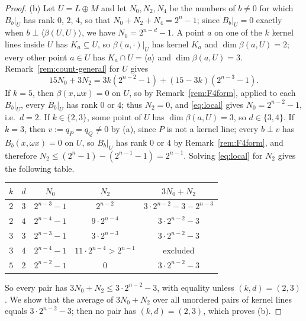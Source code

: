 \documentclass[11pt]{article}
\theoremstyle{definition}
\begin{document}
\begin{proof}
(b) Let $U=L\oplus M$ and let $N_0,N_2,N_4$ be the numbers of $b\neq0$ for which $B_b|_U$ has
rank $0$, $2$, $4$, so that $N_0+N_2+N_4=2^n-1$; since $B_b|_U=0$ exactly when
$b\perp\langle\beta(U,U)\rangle$, we have $N_0=2^{n-d}-1$. A point $a$ on one of the $k$ kernel
lines inside $U$ has $K_a\subseteq U$, so $\beta(a,\cdot)|_U$ has kernel $K_a$ and
$\dim\beta(a,U)=2$; every other point $a\in U$ has $K_a\cap U=\langle a\rangle$ and
$\dim\beta(a,U)=3$. Remark~\ref{rem:count-general} for $U$ gives
\begin{equation}\label{eq:local}
15N_0+3N_2=3k(2^{n-2}-1)+(15-3k)(2^{n-3}-1).
\end{equation}
If $k=5$, then $\beta(x,\omega x)=0$ on $U$, so by Remark~\ref{rem:F4form}, applied to each
$B_b|_U$, every $B_b|_U$ has rank $0$ or $4$; thus $N_2=0$, and \eqref{eq:local} gives
$N_0=2^{n-2}-1$, i.e.\ $d=2$. If $k\in\{2,3\}$, some point of $U$ has $\dim\beta(a,U)=3$, so
$d\in\{3,4\}$. If $k=3$, then $v:=q_P=q_Q\neq0$ by (a), since $P$ is not a kernel line; every
$b\perp v$ has $B_b(x,\omega x)=0$ on $U$, so $B_b|_U$ has rank $0$ or $4$ by
Remark~\ref{rem:F4form}, and therefore $N_2\le(2^n-1)-(2^{n-1}-1)=2^{n-1}$. Solving
\eqref{eq:local} for $N_2$ gives the following table.
\begin{center}
\begin{tabular}{ccccc}\toprule
$k$ & $d$ & $N_0$ & $N_2$ & $3N_0+N_2$\\\midrule
$2$ & $3$ & $2^{n-3}-1$ & $2^{n-2}$ & $3\cdot2^{n-2}-3-2^{n-3}$\\
$2$ & $4$ & $2^{n-4}-1$ & $9\cdot2^{n-4}$ & $3\cdot2^{n-2}-3$\\
$3$ & $3$ & $2^{n-3}-1$ & $3\cdot2^{n-3}$ & $3\cdot2^{n-2}-3$\\
$3$ & $4$ & $2^{n-4}-1$ & $11\cdot2^{n-4}>2^{n-1}$ & excluded\\
$5$ & $2$ & $2^{n-2}-1$ & $0$ & $3\cdot2^{n-2}-3$\\\bottomrule
\end{tabular}
\end{center}
So every pair has $3N_0+N_2\le3\cdot2^{n-2}-3$, with equality unless $(k,d)=(2,3)$. We show that
the average of $3N_0+N_2$ over all unordered pairs of kernel lines equals $3\cdot2^{n-2}-3$;
then no pair has $(k,d)=(2,3)$, which proves (b).


\end{proof}
\end{document}

